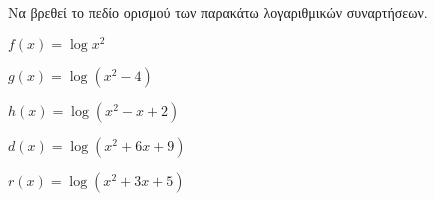 Να βρεθεί το πεδίο ορισμού των παρακάτω λογαριθμικών συναρτήσεων.
\begin{rlist}
\item $ f(x)=\log{x^2} $
\item $ g(x)=\log{\left( x^2-4\right) } $
\item $ h(x)=\log{\left( x^2-x+2\right) } $
\item $ d(x)=\log{\left( x^2+6x+9\right) } $
\item $ r(x)=\log{\left(x^2+3x+5\right) } $
\end{rlist}
